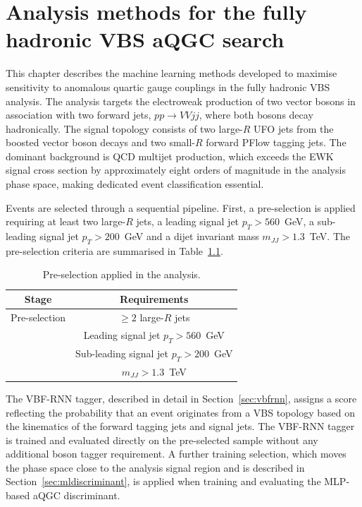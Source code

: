 \chapter{Analysis methods for the fully hadronic VBS aQGC search}
\label{chap:analysismethods}

This chapter describes the machine learning methods developed to maximise sensitivity to anomalous quartic gauge couplings in the fully hadronic VBS analysis. The analysis targets the electroweak production of two vector bosons in association with two forward jets, $pp \to VVjj$, where both bosons decay hadronically. The signal topology consists of two large-$R$ UFO jets from the boosted vector boson decays and two small-$R$ forward PFlow tagging jets. The dominant background is QCD multijet production, which exceeds the EWK signal cross section by approximately eight orders of magnitude in the analysis phase space, making dedicated event classification essential.

Events are selected through a sequential pipeline. First, a pre-selection is applied requiring at least two large-$R$ jets, a leading signal jet $p_T > 560$~GeV, a sub-leading signal jet $p_T > 200$~GeV and a dijet invariant mass $m_{JJ} > 1.3$~TeV. The pre-selection criteria are summarised in Table~\ref{tab:analysis_selection}.

\begin{table}[htbp]
  \centering
  \caption{Pre-selection applied in the analysis.}
  \label{tab:analysis_selection}
  \begin{tabular}{|c|c|}
    \hline
    \textbf{Stage} & \textbf{Requirements} \\
    \hline
    Pre-selection & $\geq 2$ large-$R$ jets \\
                  & Leading signal jet $p_T > 560$~GeV \\
                  & Sub-leading signal jet $p_T > 200$~GeV \\
                  & $m_{JJ} > 1.3$~TeV \\
    \hline
  \end{tabular}
\end{table}

The VBF-RNN tagger, described in detail in Section~\ref{sec:vbfrnn}, assigns a score reflecting the probability that an event originates from a VBS topology based on the kinematics of the forward tagging jets and signal jets. The VBF-RNN tagger is trained and evaluated directly on the pre-selected sample without any additional boson tagger requirement. A further training selection, which moves the phase space close to the analysis signal region and is described in Section~\ref{sec:mldiscriminant}, is applied when training and evaluating the MLP-based aQGC discriminant.

